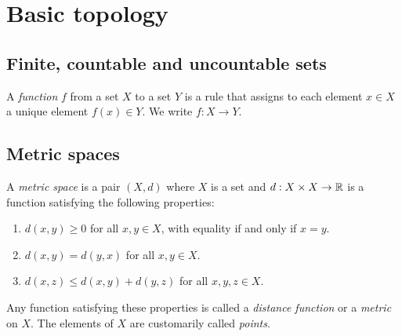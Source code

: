 \chapter{Basic topology}

\section*{Finite, countable and uncountable sets}

\begin{definition}
    A \emph{function} \(f\) from a set \(X\) to a set \(Y\) is a rule that assigns to each element \(x \in X\) a unique element \(f(x) \in Y\). We write \(f: X \to Y\).
\end{definition}

\section*{Metric spaces}
\begin{definition}
    A \emph{metric space} is a pair \((X, d)\) where \(X\) is a set and \(d: X \times X \to \mathbb{R}\) is a function satisfying the following properties:
    \begin{enumerate}
        \item \(d(x, y) \geq 0\) for all \(x, y \in X\), with equality if and only if \(x = y\).
        \item \(d(x, y) = d(y, x)\) for all \(x, y \in X\).
        \item \(d(x, z) \leq d(x, y) + d(y, z)\) for all \(x, y, z \in X\).
    \end{enumerate}
    Any function satisfying these properties is called a \emph{distance function} or a \emph{metric} on \(X\). The elements of \(X\) are customarily called \emph{points}.
\end{definition}